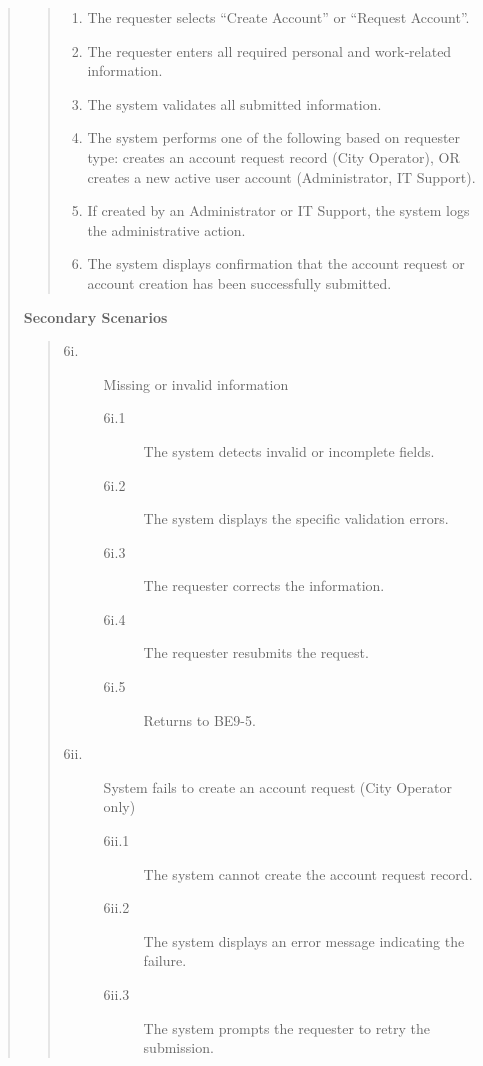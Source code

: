 \documentclass[]{article}
\begin{document}
\begin{enumerate}[{\bf BE9.}]
\begin{quote}
\begin{quote}
\begin{enumerate}[1.]
					\item The requester selects ``Create Account'' or ``Request Account''.
					\item The requester enters all required personal and work‑related information.
					\item The system validates all submitted information.
					\item The system performs one of the following based on requester type: creates an account request record (City Operator), OR creates a new active user account (Administrator, IT Support).
					\item If created by an Administrator or IT Support, the system logs the administrative action.
					\item The system displays confirmation that the account request or account creation has been successfully submitted.
                \end{enumerate}
            \end{quote}
            \textbf{Secondary Scenarios}
            \begin{quote}
                \begin{description}
                    \item[\textmd{6i.}] Missing or invalid information
                    \begin{description}
                        \item[\textmd{6i.1}] The system detects invalid or incomplete fields.
                        \item[\textmd{6i.2}] The system displays the specific validation errors.
                        \item[\textmd{6i.3}] The requester corrects the information.
                        \item[\textmd{6i.4}] The requester resubmits the request.
                        \item[\textmd{6i.5}] Returns to BE9-5.
                    \end{description}
                    \item[\textmd{6ii.}] System fails to create an account request (City Operator only)
                    \begin{description}
                        \item[\textmd{6ii.1}] The system cannot create the account request record.
                        \item[\textmd{6ii.2}] The system displays an error message indicating the failure.
                        \item[\textmd{6ii.3}] The system prompts the requester to retry the submission.

\end{description}
\end{description}
\end{quote}
\end{quote}
\end{enumerate}
\end{document}
